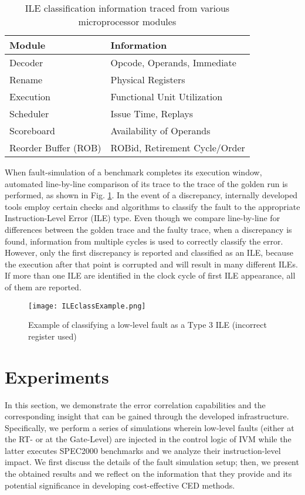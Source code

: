 \documentclass[12pt]{yalephd}
\begin{document}
\begin{table}[!ht]
\caption{ILE classification information traced from various microprocessor modules}\label{sC2Classify_Table}
\begin{center}
\begin{tabular}{||l|l||}
\hline
\hline
{\bf Module } & {\bf Information} \\
\hline
Decoder & Opcode, Operands, Immediate \\
\hline
Rename & Physical Registers \\
\hline
Execution & Functional Unit Utilization \\
\hline
Scheduler & Issue Time, Replays \\
\hline
Scoreboard & Availability of Operands \\
\hline
Reorder Buffer (ROB) & ROBid, Retirement Cycle/Order \\
\hline
\hline
\end{tabular}
\end{center}
\end{table}

When fault-simulation of a benchmark completes its execution window, automated line-by-line comparison of its trace to the trace of the golden run is performed, as shown in Fig. \ref{sC2ILExample}. In the event of a discrepancy, internally developed tools employ certain checks and algorithms to classify the fault to the appropriate Instruction-Level Error (ILE) type. Even though we compare line-by-line for differences between the golden trace and the faulty trace, when a discrepancy is found, information from multiple cycles is used to correctly classify the error. However, only the first discrepancy is reported and classified as an ILE, because the execution after that point is corrupted and will result in many different ILEs. If more than one ILE are identified in the clock cycle of first ILE appearance, all of them are reported.

\begin{figure}[!ht]
\centering
\texttt{[image: ILEclassExample.png]}
\caption{Example of classifying a low-level fault as a Type 3 ILE (incorrect register used)}
\label{sC2ILExample}
\end{figure}

\section{Experiments}\label{sC2Experiments}

In this section, we demonstrate the error correlation capabilities and the corresponding insight that can be gained through the developed infrastructure. Specifically, we perform a series of simulations wherein low-level faults (either at the RT- or at the Gate-Level) are injected in the control logic of IVM while the latter executes SPEC2000 benchmarks and we analyze their instruction-level impact. We first discuss the details of the fault simulation setup; then, we present the obtained results and we reflect on the information that they provide and its potential significance in developing cost-effective CED methods.
\end{document}
